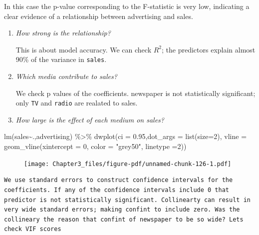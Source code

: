 \documentclass[
  letterpaper,
  DIV=11,
  numbers=noendperiod]{scrreprt}
\newenvironment{Shaded}{\begin{snugshade}}{\end{snugshade}}
\newcommand{\AttributeTok}[1]{\textcolor[rgb]{0.65,0.35,0.00}{#1}}
\newcommand{\DecValTok}[1]{\textcolor[rgb]{0.47,0.16,0.63}{#1}}
\newcommand{\FloatTok}[1]{\textcolor[rgb]{0.65,0.35,0.00}{#1}}
\newcommand{\FunctionTok}[1]{\textcolor[rgb]{0.02,0.16,0.49}{#1}}
\newcommand{\NormalTok}[1]{\textcolor[rgb]{0.33,0.33,0.33}{#1}}
\newcommand{\SpecialCharTok}[1]{\textcolor[rgb]{0.00,0.46,0.62}{#1}}
\newcommand{\StringTok}[1]{\textcolor[rgb]{0.00,0.50,0.00}{#1}}
\begin{document}
In this case the p-value corresponding to the F-statistic is very low,
indicating a clear evidence of a relationship between advertising and
sales.

\begin{enumerate}
\def\labelenumi{\arabic{enumi}.}
\setcounter{enumi}{1}
\item
  \emph{How strong is the relationship?}

  This is about model accuracy. We can check \(R^2\); the predictors
  explain almost 90\% of the variance in \texttt{sales}.
\item
  \emph{Which media contribute to sales?}

  We check p values of the coefficients. newspaper is not statistically
  significant; only \texttt{TV} and \texttt{radio} are realated to
  sales.
\item
  \emph{How large is the effect of each medium on sales?}
\end{enumerate}

\begin{Shaded}
\begin{Highlighting}[]
\FunctionTok{lm}\NormalTok{(sales}\SpecialCharTok{\textasciitilde{}}\NormalTok{.,advertising) }\SpecialCharTok{\%\textgreater{}\%}
    \FunctionTok{dwplot}\NormalTok{(}\AttributeTok{ci =} \FloatTok{0.95}\NormalTok{,}\AttributeTok{dot\_args =} \FunctionTok{list}\NormalTok{(}\AttributeTok{size=}\DecValTok{2}\NormalTok{), }\AttributeTok{vline =} \FunctionTok{geom\_vline}\NormalTok{(}\AttributeTok{xintercept =} \DecValTok{0}\NormalTok{, }\AttributeTok{color =} \StringTok{"grey50"}\NormalTok{, }\AttributeTok{linetype =}\DecValTok{2}\NormalTok{))}
\end{Highlighting}
\end{Shaded}

\begin{figure}[H]

{\centering \texttt{[image: Chapter3\_files/figure-pdf/unnamed-chunk-126-1.pdf]}

}

\end{figure}

\begin{verbatim}
We use standard errors to construct confidence intervals for the coefficients. If any of the confidence intervals include 0 that predictor is not statistically significant. Collinearty can result in very wide standard errors; making confint to include zero. Was the collineary the reason that confint of newspaper to be so wide? Lets check VIF scores
\end{verbatim}
\end{document}
